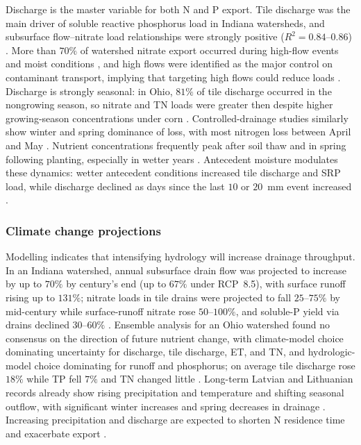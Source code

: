 \documentclass[11pt]{article}
\begin{document}
Discharge is the master variable for both N and P export. Tile discharge
was the main driver of soluble reactive phosphorus load in Indiana
watersheds, and subsurface flow--nitrate load relationships were strongly
positive ($R^2 = 0.84$--$0.86$) \parencite{Trentman2020,Dattamudi2020}.
More than $70\%$ of watershed nitrate export occurred during high-flow
events and moist conditions \parencite{Hanrahan2018}, and high flows were
identified as the major control on contaminant transport, implying that
targeting high flows could reduce loads \parencite{Ghane2016b}. Discharge
is strongly seasonal: in Ohio, $81\%$ of tile discharge occurred in the
nongrowing season, so nitrate and TN loads were greater then despite
higher growing-season concentrations under corn \parencite{King2016}.
Controlled-drainage studies similarly show winter and spring dominance of
loss, with most nitrogen loss between April and May
\parencite{Strock2025b,Grenon2023}. Nutrient concentrations frequently
peak after soil thaw and in spring following planting, especially in
wetter years \parencite{Magner2004,Smith2008,Bechmann2014}. Antecedent
moisture modulates these dynamics: wetter antecedent conditions increased
tile discharge and SRP load, while discharge declined as days since the
last $10$ or $20$~mm event increased \parencite{Trentman2020}.

\subsubsection{Climate change projections}

Modelling indicates that intensifying hydrology will increase drainage
throughput. In an Indiana watershed, annual subsurface drain flow was
projected to increase by up to $70\%$ by century's end (up to $67\%$ under
RCP~8.5), with surface runoff rising up to $131\%$; nitrate loads in tile
drains were projected to fall $25$--$75\%$ by mid-century while surface-runoff
nitrate rose $50$--$100\%$, and soluble-P yield via drains declined
$30$--$60\%$ \parencite{Mehan2019}. Ensemble analysis for an Ohio watershed
found no consensus on the direction of future nutrient change, with
climate-model choice dominating uncertainty for discharge, tile discharge,
ET, and TN, and hydrologic-model choice dominating for runoff and
phosphorus; on average tile discharge rose $18\%$ while TP fell $7\%$ and
TN changed little \parencite{Kujawa2020}. Long-term Latvian and Lithuanian
records already show rising precipitation and temperature and shifting
seasonal outflow, with significant winter increases and spring decreases
in drainage \parencite{Lagzdins2015,Povilaitis2018}. Increasing
precipitation and discharge are expected to shorten N residence time and
exacerbate export \parencite{Raymond2012}.
\end{document}
